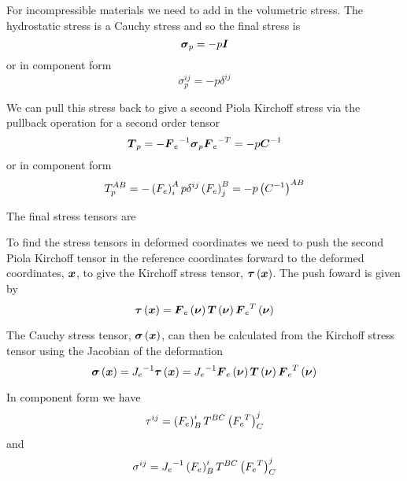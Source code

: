 For incompressible materials we need to add in the volumetric stress. The
hydrostatic stress is a Cauchy stress and so the final stress is 
\begin{equation}
  \boldsymbol{\sigma}_{p} = -p\boldsymbol{I}
\end{equation}
or in component form
\begin{equation}
  \sigma_{p}^{ij} = -p\delta^{ij}
\end{equation}

We can pull this stress back to give a second Piola Kirchoff stress via the
pullback operation for a second order tensor \ie
\begin{equation}
  \boldsymbol{T}_{p}=
  -{\boldsymbol{F}_{e}}^{-1}\boldsymbol{\sigma}_{p}{\boldsymbol{F}_{e}}^{-T} = -p{\boldsymbol{C}}^{-1}
\end{equation}
or in component form
\begin{equation}
  T_{p}^{AB}=-\left( F_{e} \right)^{A}_{i}p\delta^{ij}\left( F_{e} \right)^{B}_{j}=-p\left( {C}^{-1} \right)^{AB}
\end{equation}

The final stress tensors are

To find the stress tensors in deformed coordinates we need to push the second
Piola Kirchoff tensor in the reference coordinates forward to the deformed
coordinates, $\boldsymbol{x}$, to give the Kirchoff stress tensor,
$ \boldsymbol{\tau}\left( \boldsymbol{x} \right) $. The push foward is given by
\begin{equation}
   \boldsymbol{\tau}\left( \boldsymbol{x} \right) = \boldsymbol{F}_{e}\left( \boldsymbol{\nu} \right)  \boldsymbol{T}\left( \boldsymbol{\nu} \right) 
   {\boldsymbol{F}_{e}}^{T}\left( \boldsymbol{\nu} \right) 
\end{equation}

The Cauchy stress tensor, $ \boldsymbol{\sigma}\left( \boldsymbol{x} \right) $, can then be calculated from the Kirchoff stress
tensor using the Jacobian of the deformation \ie
\begin{equation}
   \boldsymbol{\sigma}\left( \boldsymbol{x} \right) ={J_{e}}^{-1} \boldsymbol{\tau}\left( \boldsymbol{x} \right) ={J_{e}}^{-1}
   \boldsymbol{F}_{e}\left( \boldsymbol{\nu} \right)  \boldsymbol{T}\left( \boldsymbol{\nu} \right)  {\boldsymbol{F}_{e}}^{T}\left( \boldsymbol{\nu} \right) 
\end{equation}

In component form we have
\begin{equation}
  \tau^{ij}=\left( F_{e} \right)^{i}_{B}T^{BC}\left( {F_{e}}^{T} \right)^{j}_{C}
\end{equation}
and
\begin{equation}
  \sigma^{ij}={J_{e}}^{-1}\left( F_{e} \right)^{i}_{B}T^{BC}\left( {F_{e}}^{T} \right)^{j}_{C}
\end{equation}

